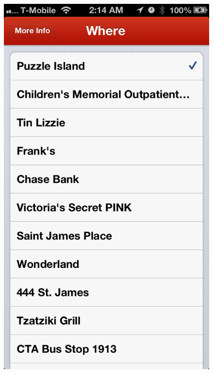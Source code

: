 \begin{figure}
{	\includegraphics[width=\figwidth, totalheight=\figheight, keepaspectratio]{./screenshots/home-where.png}} \hfill
\end{figure}
